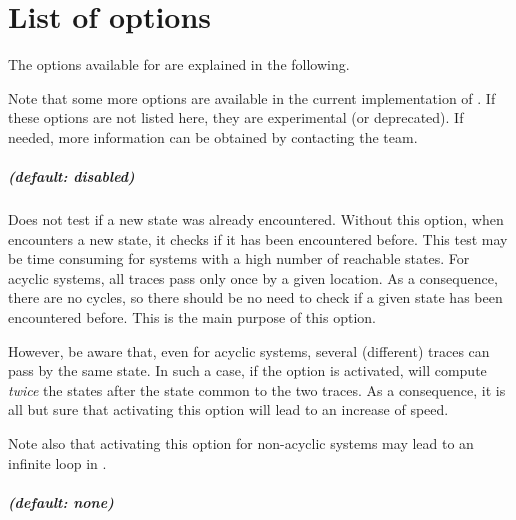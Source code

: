 \chapter{List of options}\label{chapter:options}

The options available for \imitator{} are explained in the following.

Note that some more options are available in the current implementation of \imitator{}.
If these options are not listed here, they are experimental (or deprecated).
If needed, more information can be obtained by contacting the \imitator{} team.



\paragraph{ (default: disabled)}
Does not test if a new state was already encountered.
Without this option, when \imitator{} encounters a new state, it checks if it has been encountered before.
This test may be time consuming for systems with a high number of reachable states.
For acyclic systems, all traces pass only once by a given location.
As a consequence, there are no cycles, so there should be no need to check if a given state has been encountered before.
This is the main purpose of this option.

However, be aware that, even for acyclic systems, several (different) traces can pass by the same state.
In such a case, if the  option is activated, \imitator{} will compute \emph{twice} the states after the state common to the two traces.
As a consequence, it is all but sure that activating this option will lead to an increase of speed.

Note also that activating this option for non-acyclic systems may lead to an infinite loop in \imitator{}.


\paragraph{ (default: none)}


